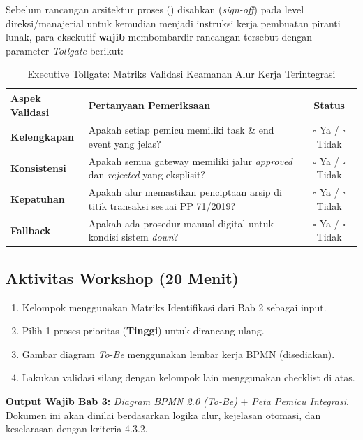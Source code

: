 \documentclass[12pt,a4paper]{report}
\begin{document}
Sebelum rancangan arsitektur proses () disahkan (\textit{sign-off}) pada level direksi/manajerial untuk kemudian menjadi instruksi kerja pembuatan piranti lunak, para eksekutif \textbf{wajib} membombardir rancangan tersebut dengan parameter \textit{Tollgate} berikut:

\begin{table}[htbp]
\centering
\small
\caption{Executive Tollgate: Matriks Validasi Keamanan Alur Kerja Terintegrasi}
\begin{tabularx}{\textwidth}{@{} >{\raggedright\arraybackslash}X >{\raggedright\arraybackslash}X c @{}}
\toprule
\textbf{Aspek Validasi} & \textbf{Pertanyaan Pemeriksaan} & \textbf{Status} \\
\midrule
\textbf{Kelengkapan} & Apakah setiap pemicu memiliki task \& end event yang jelas? & $\square$ Ya / $\square$ Tidak \\
\textbf{Konsistensi} & Apakah semua gateway memiliki jalur \textit{approved} dan \textit{rejected} yang eksplisit? & $\square$ Ya / $\square$ Tidak \\
\textbf{Kepatuhan} & Apakah alur memastikan penciptaan arsip di titik transaksi sesuai PP 71/2019? & $\square$ Ya / $\square$ Tidak \\
\textbf{Fallback} & Apakah ada prosedur manual digital untuk kondisi sistem \textit{down}? & $\square$ Ya / $\square$ Tidak \\
\bottomrule
\end{tabularx}
\end{table}

\subsection*{Aktivitas Workshop (20 Menit)}
\begin{enumerate}[leftmargin=*]
    \item Kelompok menggunakan Matriks Identifikasi dari Bab 2 sebagai input.
    \item Pilih 1 proses prioritas (\textbf{Tinggi}) untuk dirancang ulang.
    \item Gambar diagram \textit{To-Be} menggunakan lembar kerja BPMN (disediakan).
    \item Lakukan validasi silang dengan kelompok lain menggunakan checklist di atas.
\end{enumerate}

\begin{outputbox}
\textbf{Output Wajib Bab 3:} \textit{Diagram BPMN 2.0 (To-Be)} + \textit{Peta Pemicu Integrasi}. Dokumen ini akan dinilai berdasarkan logika alur, kejelasan otomasi, dan keselarasan dengan kriteria 4.3.2.
\end{outputbox}
\end{document}
